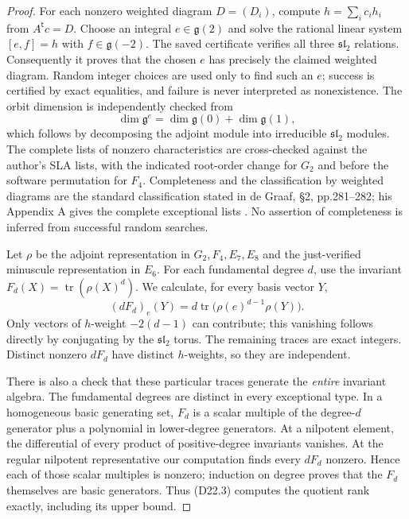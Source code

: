 \begin{proof}
For each nonzero weighted diagram $D=(D_i)$, compute
$h=\sum_i c_i h_i$ from $A^{\mathsf t}c=D$.
Choose an integral $e\in\mathfrak g(2)$ and solve the rational
linear system $[e,f]=h$ with $f\in\mathfrak g(-2)$.
The saved certificate verifies all three $\mathfrak{sl}_2$ relations.
Consequently it proves that the chosen $e$ has precisely the claimed
weighted diagram.  Random integer choices are used only to find
such an $e$; success is certified by exact equalities, and failure
is never interpreted as nonexistence.  The orbit dimension is
independently checked from
\[
 \dim\mathfrak g^e=\dim\mathfrak g(0)+\dim\mathfrak g(1),
\]
which follows by decomposing the adjoint module into irreducible
$\mathfrak{sl}_2$ modules.
The complete lists of nonzero characteristics are cross-checked
against the author's SLA lists, with the indicated root-order
change for $G_2$ and before the software permutation for $F_4$.
Completeness and the classification by weighted diagrams are the
standard classification stated in de Graaf, \S2, pp.281--282;
his Appendix A gives the complete exceptional lists
\cite{D-deGraaf}.  No assertion of completeness is inferred from
successful random searches.

Let $\rho$ be the adjoint representation in $G_2,F_4,E_7,E_8$
and the just-verified minuscule representation in $E_6$.
For each fundamental degree $d$, use the invariant
$F_d(X)=\operatorname{tr}(\rho(X)^d)$.  We calculate, for every
basis vector $Y$,
\[
 (dF_d)_e(Y)=d\operatorname{tr}
                 \bigl(\rho(e)^{d-1}\rho(Y)\bigr).       \tag{D22.3}
\]
Only vectors of $h$-weight $-2(d-1)$ can contribute; this vanishing
follows directly by conjugating by the $\mathfrak{sl}_2$ torus.
The remaining traces are exact integers.  Distinct nonzero
$dF_d$ have distinct $h$-weights, so they are independent.

There is also a check that these particular traces generate the
\emph{entire} invariant algebra.  The fundamental degrees are distinct
in every exceptional type.  In a homogeneous basic generating set,
$F_d$ is a scalar multiple of the degree-$d$ generator plus a
polynomial in lower-degree generators.  At a nilpotent element,
the differential of every product of positive-degree invariants
vanishes.  At the regular nilpotent representative our computation
finds every $dF_d$ nonzero.  Hence each of those scalar multiples
is nonzero; induction on degree proves that the $F_d$ themselves
are basic generators.  Thus (D22.3) computes the quotient rank
exactly, including its upper bound.


\end{proof}
